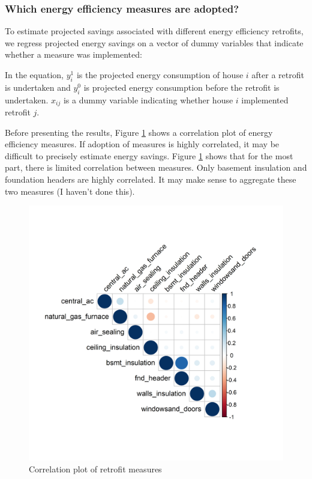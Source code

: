 \documentclass{article}
\begin{document}
\subsubsection{Which energy efficiency measures are adopted?}
To estimate projected savings associated with different energy efficiency retrofits, we regress projected energy savings on a vector of dummy variables that indicate whether a measure was implemented:

In the equation, $y^1_i$ is the projected energy consumption of house $i$ after a retrofit is undertaken and $y^0_i$ is projected energy consumption before the retrofit is undertaken. $x_{ij}$ is a dummy variable indicating whether house $i$ implemented retrofit $j$.

Before presenting the results, Figure \ref{fig_corplot} shows a correlation plot of energy efficiency measures. If adoption of measures is highly correlated, it may be difficult to precisely estimate energy savings.  Figure \ref{fig_corplot} shows that for the most part, there is limited correlation between measures.  Only basement insulation and foundation headers are highly correlated.  It may make sense to aggregate these two measures (I haven't done this).

\begin{figure}
	\includegraphics{"../output_figures_tables/correlation_plot.png"}
	\caption{Correlation plot of retrofit measures}\label{fig_corplot}
\end{figure}
\end{document}
